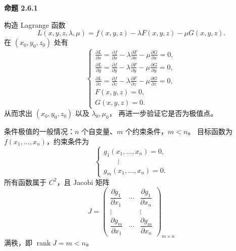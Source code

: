 \textbf{命题 2.6.1}

构造 Lagrange 函数
\[
L(x,y,z,\lambda,\mu)
=f(x,y,z)-\lambda F(x,y,z)-\mu G(x,y,z).
\]
在 $(x_0,y_0,z_0)$ 处有
\[
\begin{cases}
\displaystyle\frac{\partial L}{\partial x}
=\frac{\partial f}{\partial x}
-\lambda\frac{\partial F}{\partial x}
-\mu\frac{\partial G}{\partial x}=0,\\[6pt]
\displaystyle\frac{\partial L}{\partial y}
=\frac{\partial f}{\partial y}
-\lambda\frac{\partial F}{\partial y}
-\mu\frac{\partial G}{\partial y}=0,\\[6pt]
\displaystyle\frac{\partial L}{\partial z}
=\frac{\partial f}{\partial z}
-\lambda\frac{\partial F}{\partial z}
-\mu\frac{\partial G}{\partial z}=0,\\[6pt]
F(x,y,z)=0,\\
G(x,y,z)=0.
\end{cases}
\]
从而求出 $(x_0,y_0,z_0)$ 以及 $\lambda_0,\mu_0$，
再进一步验证它是否为极值点。




条件极值的一般情况：$n$ 个自变量、$m$ 个约束条件，$m<n$。
目标函数为 $f(x_1,\ldots,x_n)$，约束条件为
\[
\begin{cases}
g_1(x_1,\ldots,x_n)=0,\\
\qquad\vdots\\
g_m(x_1,\ldots,x_n)=0.
\end{cases}\tag{*}
\]
所有函数属于 $C^2$，且 Jacobi 矩阵
\[
J=
\begin{pmatrix}
\dfrac{\partial g_1}{\partial x_1}&\cdots&
\dfrac{\partial g_1}{\partial x_n}\\
\vdots&&\vdots\\
\dfrac{\partial g_m}{\partial x_1}&\cdots&
\dfrac{\partial g_m}{\partial x_n}
\end{pmatrix}_{m\times n}
\]
满秩，即 $\operatorname{rank}J=m<n$。

